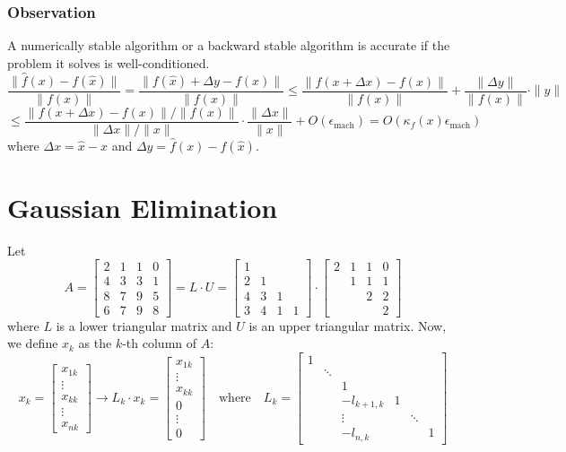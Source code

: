 \documentclass[11pt]{article}
\begin{document}
\subsubsection*{Observation}
A numerically stable algorithm or a backward stable algorithm is accurate if the problem it solves is well-conditioned.
\[\frac{\|\hat{f}(x) - f(\hat{x})\|}{\|f(x)\|} = \frac{\|f(\hat{x}) + \Delta y - f(x)\|}{\|f(x)\|} \leq \frac{\|f(x + \Delta x) - f(x)\|}{\|f(x)\|} + \frac{\|\Delta y\|}{\|f(x)\|} \cdot \|y\|\]
\[\leq \frac{\|f(x + \Delta x) - f(x)\| / \|f(x)\|}{\|\Delta x\| / \|x\|} \cdot \frac{\|\Delta x\|}{\|x\|} + O(\epsilon_{\text{mach}}) = O(\kappa_f(x) \epsilon_{\text{mach}})\]
where \( \Delta x = \hat{x} - x \) and \( \Delta y = \hat{f}(x) - f(\hat{x}) \).

\section{Gaussian Elimination}
Let 
\[A = \begin{bmatrix}
    2 & 1 & 1 & 0 \\
    4 & 3 & 3 & 1 \\
    8 & 7 & 9 & 5 \\
    6 & 7 & 9 & 8
\end{bmatrix}= L \cdot U = \begin{bmatrix}
    1 \\ 
    2 & 1 \\
    4 & 3 & 1 \\
    3 & 4 & 1 & 1
\end{bmatrix} \cdot \begin{bmatrix}
    2 & 1 & 1 & 0 \\
    & 1 & 1 & 1 \\
    & & 2 & 2 \\
    & & & 2
\end{bmatrix}\]
where \( L \) is a lower triangular matrix and \( U \) is an upper triangular matrix. Now, we define \(x_k\) as the \(k\)-th column of \(A\):
\[x_k = \begin{bmatrix}
    x_{1k} \\
    \vdots \\
    x_{kk} \\
    \vdots \\
    x_{nk}
\end{bmatrix} \longrightarrow L_k \cdot x_k = \begin{bmatrix}
    x_{1k} \\
    \vdots \\
    x_{kk} \\
    0 \\
    \vdots \\
    0
\end{bmatrix} \quad \text{where} \quad L_k = \begin{bmatrix}
    1 & & & & & \\
    & \ddots & & & & \\
    & & 1 & & & \\
    & & -l_{k+1,k} & 1 & & \\
    & & \vdots & & \ddots & \\
    & & -l_{n,k} & & & 1
\end{bmatrix}\]
\end{document}
